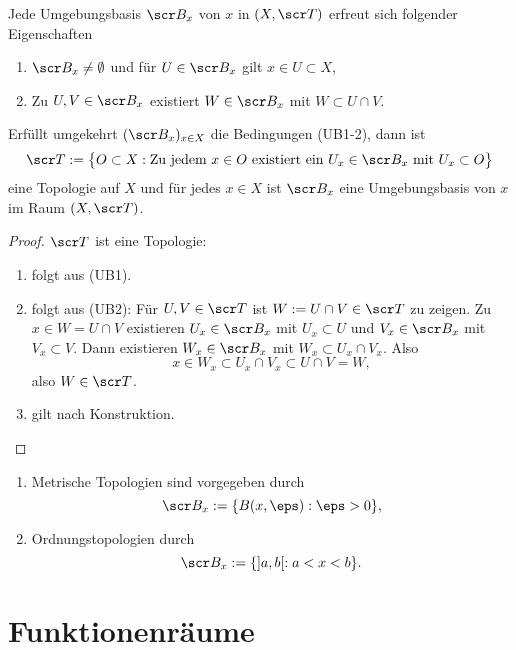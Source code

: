 
\begin{st}
	Jede Umgebungsbasis $\scr B_x$ von $x$ in $(X, \scr T)$ erfreut sich folgender Eigenschaften
	\begin{enumerate}[(UB1)]
		\item
			$\scr B_x \neq \emptyset$ und für $U \in \scr B_x$ gilt $x \in U \subset X$,
		\item
			Zu $U,V \in \scr B_x$ existiert $W \in \scr B_x$ mit $W \subset U \cap V$.
	\end{enumerate}
	Erfüllt umgekehrt $(\scr B_x)_{x\in X}$ die Bedingungen (UB1-2), dann ist
	\[
		\scr T := \big\{ O \subset X : \text{Zu jedem $x\in O$ existiert ein $U_x \in \scr B_x$ mit $U_x \subset O$} \big\}
	\]
	eine Topologie auf $X$ und für jedes $x \in X$ ist $\scr B_x$ eine Umgebungsbasis von $x$ im Raum $(X, \scr T)$.
	\begin{proof}
		$\scr T$ ist eine Topologie:
		\begin{enumerate}[(O1)]
			\item
				folgt aus (UB1).
			\item
				folgt aus (UB2):
				Für $U, V \in \scr T$ ist $W := U \cap V \in \scr T$ zu zeigen.
				Zu $x \in W = U \cap V$ existieren $U_x \in \scr B_x$ mit $U_x \subset U$ und $V_x \in \scr B_x$ mit $V_x \subset V$.
				Dann existieren $W_x \in \scr B_x$ mit $W_x \subset U_x \cap V_x$.
				Also
				\[
					x \in W_x \subset U_x \cap V_x \subset U \cap V = W,
				\]
				also $W \in \scr T$.
			\item
				gilt nach Konstruktion.
		\end{enumerate}
	\end{proof}
\end{st}

\begin{ex}
	\begin{enumerate}[1.)]
		\item
			Metrische Topologien sind vorgegeben durch
			\[
				\scr B_x := \{ B(x,\eps) : \eps > 0 \},
			\]
		\item
			Ordnungstopologien durch
			\[
				\scr B_x := \{ ]a,b[ : a < x < b \}.
			\]
	\end{enumerate}
\end{ex}

\section{Funktionenräume}

